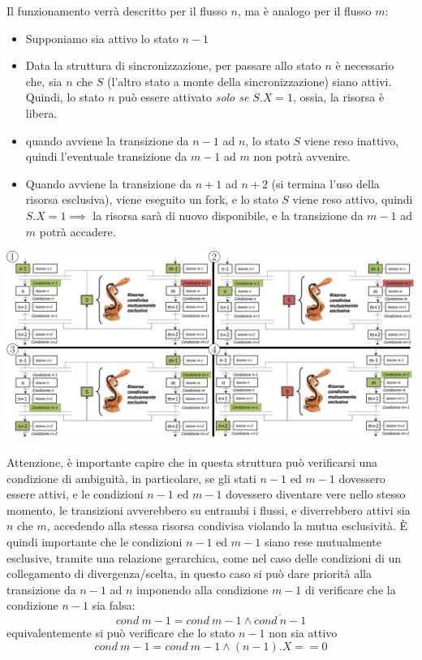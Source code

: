 \documentclass[10pt, letterpaper]{report}
\begin{document}
Il funzionamento verrà descritto per il flusso $n$, ma è analogo per il flusso $m$:\begin{itemize}
    \item Supponiamo sia attivo lo stato $n-1$
    \item Data la struttura di sincronizzazione, per passare allo stato $n$ è necessario che, sia $n$ che $S$ (l'altro stato a monte della sincronizzazione) siano attivi. Quindi, lo stato $n$ può essere attivato \textit{solo se} $S.X=1$, ossia, la risorsa è libera.
    \item quando avviene la transizione da $n-1$ ad $n$, lo stato $S$ viene reso inattivo, quindi l'eventuale transizione da $m-1$ ad $m$ non potrà avvenire. 
    \item Quando avviene la transizione da $n+1$ ad $n+2$ (si termina l'uso della risorsa esclusiva), viene eseguito un fork, e lo stato $S$ viene reso attivo, quindi $S.X=1\implies$ la risorsa sarà di nuovo disponibile, e la transizione da $m-1$ ad $m$ potrà accadere. 
\end{itemize}
\begin{center}
    \includegraphics[width=1\textwidth ]{images/mutuaEsclusione3.png}
\end{center}
Attenzione, è importante capire che in questa struttura può verificarsi una condizione di ambiguità, in particolare, se gli stati $n-1$ ed $m-1$ dovessero essere attivi, e le condizioni $n-1$ ed $m-1$ dovessero diventare vere nello stesso momento, le transizioni avverebbero su entrambi i flussi, e diverrebbero attivi sia $n$ che $m$, accedendo alla stessa risorsa condivisa violando la mutua esclusività.\acc 
È quindi importante che le condizioni $n-1$ ed $m-1$ siano rese mutualmente esclusive, tramite una relazione gerarchica, come nel caso delle condizioni di un collegamento di divergenza/scelta, in questo caso si può dare priorità alla transizione da $n-1$ ad $n$ imponendo alla condizione $m-1$ di verificare che  la condizione $n-1$ sia falsa:
$$ cond \ m-1 = cond\ m-1 \land \overline{cond \ n-1}$$
equivalentemente si può verificare che lo stato $n-1$ non sia attivo
$$ cond \ m-1 = cond\ m-1 \land (n-1).X==0$$
\end{document}
